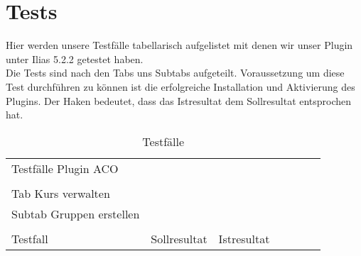 \chapter{Tests}
\minitoc

Hier werden unsere Testfälle tabellarisch aufgelistet mit denen wir unser Plugin unter Ilias 5.2.2 getestet haben. \\
Die Tests sind nach den Tabs uns Subtabs aufgeteilt. Voraussetzung um diese Test durchführen zu können ist die erfolgreiche Installation und Aktivierung des Plugins.  
Der Haken bedeutet, dass das Istresultat dem Sollresultat entsprochen hat. \\

\begin{table}[]
	\centering
	\caption{Testfälle}
	\label{my-label}
	\begin{tabular}{p{6cm}p{7cm}p{3cm}llll}
		Testfälle Plugin ACO                                                                                                                 &                                                                                                          &             &  &  &  \\
		&                                                                                                                                                                  &             &  &  &  \\
		Tab Kurs verwalten                                                                                                                   &                                                                                                                                                                  &             &  &  &  \\
		Subtab Gruppen erstellen                                                                                                             &                                                                                                                                                                  &             &  &  &  \\
		&                                                                                                                                                                  &             &  &  &  \\
		Testfall                                                                                                                             & Sollresultat                                                                                                                                                     & Istresultat &  &  &  \\

\end{tabular}
\end{table}
